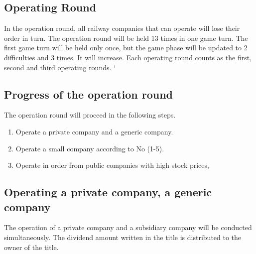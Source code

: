 \documentclass{article}
\begin{document}
\begin{CJK}{UTF8}{min}


\section{Operating Round}
In the operation round, all railway companies that can operate will
lose their order in turn. The operation round will be held 13 times in
one game turn. The first game turn will be held only once, but the
game phase will be updated to 2 difficulties and 3 times. It will
increase. Each operating round counts as the first, second and third
operating rounds. `

\subsection{Progress of the operation round}
The operation round will proceed in the following steps.
\begin{enumerate}
\item Operate a private company and a generic company.
\item Operate a small company according to No (1-5).
\item Operate in order from public companies with high stock prices,
\end{enumerate}

\subsection{Operating a private company, a generic company}
The operation of a private company and a subsidiary company will be
conducted simultaneously. The dividend amount written in the title is
distributed to the owner of the title.


\end{CJK}
\end{document}
